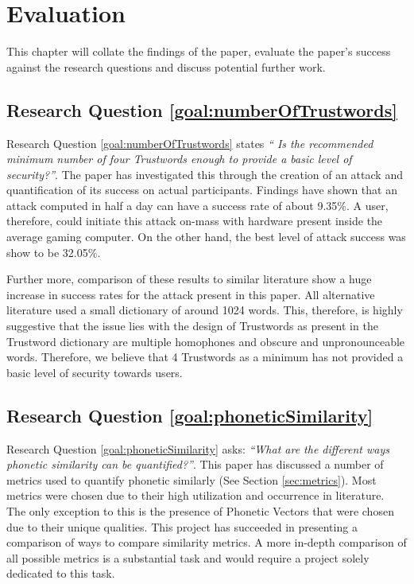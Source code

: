 \chapter{Evaluation}
This chapter will collate the findings of the paper, evaluate the paper's success against the research questions and discuss potential further work.

\section{Research Question \ref{goal:numberOfTrustwords}}
Research Question \ref{goal:numberOfTrustwords} states \textit{`` Is the recommended minimum number of four Trustwords enough to provide a basic level of security?''}. The paper has investigated this through the creation of an attack and quantification of its success on actual participants. Findings have shown that an attack computed in half a day can have a success rate of about 9.35\%. A user, therefore, could initiate this attack on-mass with hardware present inside the average gaming computer. On the other hand, the best level of attack success was show to be 32.05\%. 

Further more, comparison of these results to similar literature show a huge increase in success rates for the attack present in this paper. All alternative literature used a small dictionary of around 1024 words. This, therefore, is highly suggestive that the issue lies with the design of Trustwords as present in the Trustword dictionary are multiple homophones and obscure and unpronounceable words. Therefore, we believe that 4 Trustwords as a minimum has not provided a basic level of security towards users.


\section{Research Question \ref{goal:phoneticSimilarity}}

Research Question \ref{goal:phoneticSimilarity} asks: \textit{``What are the different ways phonetic similarity can be quantified?''}. This paper has discussed a number of metrics used to quantify phonetic similarly (See Section \ref{sec:metrics}). Most metrics were chosen due to their high utilization and occurrence in literature. The only exception to this is the presence of Phonetic Vectors that were chosen due to their unique qualities. This project has succeeded in presenting a comparison of ways to compare similarity metrics. A more in-depth comparison of all possible metrics is a substantial task and would require a project solely dedicated to this task.

